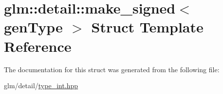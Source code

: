 \hypertarget{structglm_1_1detail_1_1make__signed}{\section{glm\-:\-:detail\-:\-:make\-\_\-signed$<$ gen\-Type $>$ Struct Template Reference}
\label{structglm_1_1detail_1_1make__signed}
}


The documentation for this struct was generated from the following file\-:\begin{DoxyCompactItemize}
\item 
glm/detail/\hyperlink{type__int_8hpp}{type\-\_\-int.\-hpp}\end{DoxyCompactItemize}
